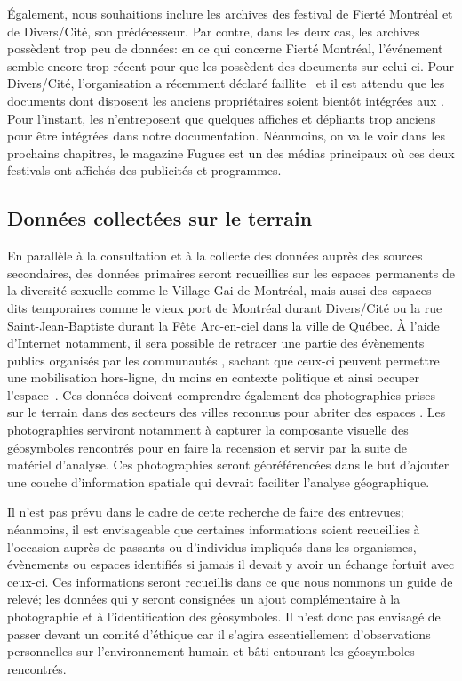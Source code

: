 Également, nous souhaitions inclure les archives des festival de Fierté Montréal et de Divers/Cité, son prédécesseur. 
Par contre, dans les deux cas, les archives possèdent trop peu de données: en ce qui concerne Fierté Montréal, l'événement semble encore trop récent pour que les \agq{} possèdent des documents sur celui-ci. 
Pour Divers/Cité, l'organisation a récemment déclaré faillite~\citep{Cormier2015} et il est attendu que les documents dont disposent les anciens propriétaires soient bientôt intégrées aux \agq{}. 
Pour l'instant, les \agq{} n'entreposent que quelques affiches et dépliants trop anciens pour être intégrées dans notre documentation. 
Néanmoins, on va le voir dans les prochains chapitres, le magazine Fugues est un des médias principaux où ces deux festivals ont affichés des publicités et programmes.

\subsection{Données collectées sur le terrain}
\label{sub:donnees_collectees_sur_le_terrain}
En parallèle à la consultation et à la collecte des données auprès des sources secondaires, des données primaires seront recueillies sur les espaces permanents de la diversité sexuelle comme le Village Gai de Montréal, mais aussi des espaces dits temporaires comme le vieux port de Montréal durant Divers/Cité ou la rue Saint-Jean-Baptiste durant la Fête Arc-en-ciel dans la ville de Québec. 
À l'aide d'Internet notamment, il sera possible de retracer une partie des évènements publics organisés par les communautés \lgbt{}, sachant que ceux-ci peuvent permettre une mobilisation hors-ligne, du moins en contexte politique et ainsi occuper l'espace~\citep[153-154]{Mercea2011}. 
Ces données doivent comprendre également des photographies prises sur le terrain dans des secteurs des villes reconnus pour abriter des espaces \qus{}. 
Les photographies serviront notamment à capturer la composante visuelle des géosymboles rencontrés pour en faire la recension et servir par la suite de matériel d'analyse. 
Ces photographies seront géoréférencées dans le but d'ajouter une couche d'information spatiale qui devrait faciliter l'analyse géographique.

Il n'est pas prévu dans le cadre de cette recherche de faire des entrevues; néanmoins, il est envisageable que certaines informations soient recueillies à l'occasion auprès de passants ou d'individus impliqués dans les organismes, évènements ou espaces identifiés si jamais il devait y avoir un échange fortuit avec ceux-ci. 
Ces informations seront recueillis dans ce que nous nommons un guide de relevé; les données qui y seront consignées un ajout complémentaire à la photographie et à l'identification des géosymboles. 
Il n'est donc pas envisagé de passer devant un comité d'éthique car il s'agira essentiellement d'observations personnelles sur l'environnement humain et bâti entourant les géosymboles rencontrés.

